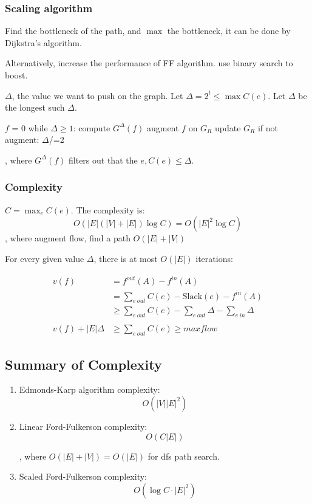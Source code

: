\documentclass[a4paper]{report}
\theoremstyle{definition}
\begin{document}
\subsubsection{Scaling algorithm}
Find the bottleneck of the path, and $\max$ the bottleneck, it can be done by Dijkstra's algorithm.

Alternatively, increase the performance of FF algorithm. use binary search to boost.

$\Delta$, the value we want to push on the graph. Let $\Delta=2^t \leq \max C(e)$. Let $\Delta$ be the longest such $\Delta$.
\begin{python}[mathescape]
$f$ = 0
while $\Delta\geq 1$:
  compute $G^\Delta(f)$
  augment $f$ on $G_R$
  update $G_R$
  if not augment:
    $\Delta$/=2
\end{python}
, where $G^\Delta(f)$ filters out that the $e, C(e)\leq \Delta$.
\subsubsection{Complexity}
$C = \max_{e}C(e)$. The complexity is:
$$
O(|E|(|V|+|E|)\log C) = O(|E|^2 \log C)
$$
, where augment flow, find a path $O(|E|+|V|)$

For every given value $\Delta$, there is at most $O(|E|)$ iterations:

\begin{align*}
v(f) &= f^{out}(A)-f^{in}(A) \\
&= \sum_{e~out}C(e)-\text{Slack}(e)-f^{in}(A) \\
&\geq \sum_{e~out}C(e)-\sum_{e~out}\Delta-\sum_{e~in}\Delta \\
\\
v(f)+|E|\Delta &\geq \sum_{e~out}C(e) \geq maxflow
\end{align*}

\subsection{Summary of Complexity}
\begin{enumerate}
\item Edmonds-Karp algorithm complexity:
$$
O(|V||E|^2)
$$
\item Linear Ford-Fulkerson complexity:
$$
O(C|E|)
$$

, where $O(|E|+|V|)=O(|E|)$ for dfs path search. 
\item Scaled Ford-Fulkerson complexity:
$$
O(\log C \cdot |E|^2)
$$
\end{enumerate}
\end{document}
